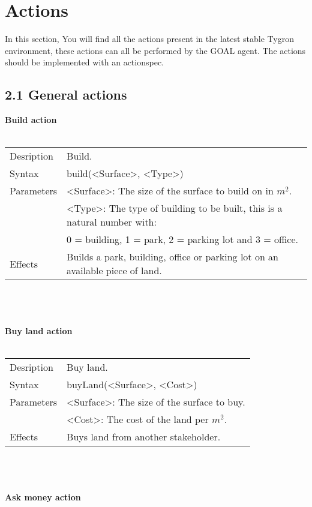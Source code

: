 \documentclass[english,11pt]{report}
\begin{document}
\chapter{Actions}

In this section, You will find all the actions present in the latest stable Tygron environment, these actions can all be performed by the GOAL agent. The actions should be implemented with an actionspec.

\newpage
\section*{2.1 General actions}

\textbf{Build action}\\
\\
\begin{tabularx}{\textwidth}{lX}
 Desription & Build. \\
 Syntax & build(<Surface>, <Type>) \\
 Parameters & <Surface>: The size of the surface to build on in $m^2$.\\
            & <Type>: The type of building to be built, this is a natural number with: \\
            &      0 = building, 1 = park, 2 = parking lot and 3 = office.\\
 Effects &  Builds a park, building, office or parking lot on an available piece of land.
\end{tabularx}\\
\\
\\
\textbf{Buy land action}\\
\\
\begin{tabularx}{\textwidth}{lX}
 Desription & Buy land. \\
 Syntax & buyLand(<Surface>, <Cost>) \\
 Parameters & <Surface>: The size of the surface to buy.\\
            & <Cost>: The cost of the land per $m^2$.\\
 Effects &  Buys land from another stakeholder.
\end{tabularx}\\
\\
\\
\textbf{Ask money action}\\
\end{document}
